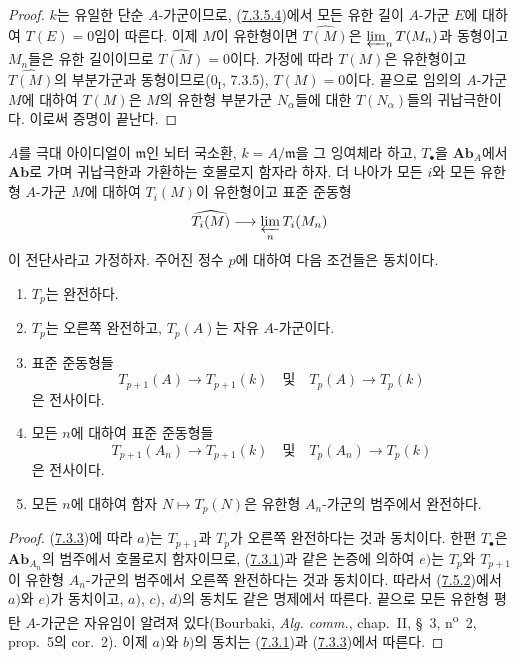 \begin{proof}
$k$는 유일한 단순 $A$-가군이므로,
(\hyperref[III.7.3.5.4.fr]{7.3.5.4})에서 모든 유한 길이 $A$-가군
$E$에 대하여 $T(E)=0$임이 따른다. 이제 $M$이 유한형이면
$\widehat{T(M)}$은 $\varprojlim_n T(M_n)$과 동형이고 $M_n$들은 유한
길이이므로 $\widehat{T(M)}=0$이다. 가정에 따라 $T(M)$은 유한형이고
$\widehat{T(M)}$의 부분가군과 동형이므로($0_{\mathrm I}$, 7.3.5),
$T(M)=0$이다. 끝으로 임의의 $A$-가군 $M$에 대하여 $T(M)$은 $M$의
유한형 부분가군 $N_\alpha$들에 대한 $T(N_\alpha)$들의 귀납극한이다.
이로써 증명이 끝난다.
\end{proof}

\begin{proposition}[7.5.4]
\label{III.7.5.4-fr}
$A$를 극대 아이디얼이 $\mathfrak m$인 뇌터 국소환, $k=A/\mathfrak m$을
그 잉여체라 하고, $T_\bullet$을 $\mathbf{Ab}_A$에서
$\mathbf{Ab}$로 가며 귀납극한과 가환하는 호몰로지 함자라 하자.
더 나아가 모든 $i$와 모든 유한형 $A$-가군 $M$에 대하여 $T_i(M)$이
유한형이고 표준 준동형
\[
  \widehat{T_i(M)}
  \longrightarrow
  \varprojlim_n T_i(M_n)
\]
이 전단사라고 가정하자. 주어진 정수 $p$에 대하여 다음 조건들은
동치이다.
\begin{enumerate}
  \item[a)] $T_p$는 완전하다.
  \item[b)] $T_p$는 오른쪽 완전하고, $T_p(A)$는 자유 $A$-가군이다.
  \item[c)] 표준 준동형들
    \[
      T_{p+1}(A)\longrightarrow T_{p+1}(k)
      \quad\text{및}\quad
      T_p(A)\longrightarrow T_p(k)
    \]
    은 전사이다.
  \item[d)] 모든 $n$에 대하여 표준 준동형들
    \[
      T_{p+1}(A_n)\longrightarrow T_{p+1}(k)
      \quad\text{및}\quad
      T_p(A_n)\longrightarrow T_p(k)
    \]
    은 전사이다.
  \item[e)] 모든 $n$에 대하여 함자 $N\mapsto T_p(N)$은 유한형
    $A_n$-가군의 범주에서 완전하다.
\end{enumerate}
\end{proposition}

\begin{proof}
(\hyperref[III.7.3.3-fr]{7.3.3})에 따라 $a)$는 $T_{p+1}$과 $T_p$가
오른쪽 완전하다는 것과 동치이다. 한편 $T_\bullet$은
$\mathbf{Ab}_{A_n}$의 범주에서 호몰로지 함자이므로,
(\hyperref[III.7.3.1-fr]{7.3.1})과 같은 논증에 의하여 $e)$는
$T_p$와 $T_{p+1}$이 유한형 $A_n$-가군의 범주에서 오른쪽 완전하다는
것과 동치이다. 따라서 (\hyperref[III.7.5.2-fr]{7.5.2})에서 $a)$와
$e)$가 동치이고, $a)$, $c)$, $d)$의 동치도 같은 명제에서 따른다.
끝으로 모든 유한형 평탄 $A$-가군은 자유임이 알려져 있다(Bourbaki,
\emph{Alg. comm.}, chap.~II, \S~3, n\textsuperscript{o}~2, prop.~5의
cor.~2). 이제 $a)$와 $b)$의 동치는
(\hyperref[III.7.3.1-fr]{7.3.1})과
(\hyperref[III.7.3.3-fr]{7.3.3})에서 따른다.
\end{proof}

